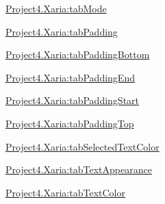 {\ttfamily \hyperlink{classproject4_1_1xaria_1_1R_1_1styleable_afcef95dafaf4ae2b599ba4d8353ffddf}{Project4.\+Xaria\+:tab\+Mode}}

{\ttfamily \hyperlink{classproject4_1_1xaria_1_1R_1_1styleable_ac7d60eaa3c996af7b321340db6e3a4f5}{Project4.\+Xaria\+:tab\+Padding}}

{\ttfamily \hyperlink{classproject4_1_1xaria_1_1R_1_1styleable_a0482d61a95e5a8235145359e07653b15}{Project4.\+Xaria\+:tab\+Padding\+Bottom}}

{\ttfamily \hyperlink{classproject4_1_1xaria_1_1R_1_1styleable_a5e2194c0ed2bb35846788cfeed3fcb22}{Project4.\+Xaria\+:tab\+Padding\+End}}

{\ttfamily \hyperlink{classproject4_1_1xaria_1_1R_1_1styleable_a14c5feee7b7d3f34cae3fc0247483fb2}{Project4.\+Xaria\+:tab\+Padding\+Start}}

{\ttfamily \hyperlink{classproject4_1_1xaria_1_1R_1_1styleable_a5041e5aa45eb71245d2c71dd376b1471}{Project4.\+Xaria\+:tab\+Padding\+Top}}

{\ttfamily \hyperlink{classproject4_1_1xaria_1_1R_1_1styleable_a6712e8d9a5755a29fa64dfcc525d7652}{Project4.\+Xaria\+:tab\+Selected\+Text\+Color}}

{\ttfamily \hyperlink{classproject4_1_1xaria_1_1R_1_1styleable_a053cc43fb27e9cdefa49d30126adbbc7}{Project4.\+Xaria\+:tab\+Text\+Appearance}}

{\ttfamily \hyperlink{classproject4_1_1xaria_1_1R_1_1styleable_ae3d2d69da095e365fb2c36ae299f0100}{Project4.\+Xaria\+:tab\+Text\+Color}}


